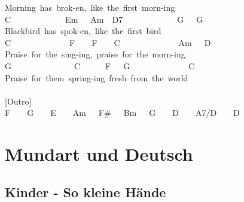 \documentclass[]{book}
\let\stdsection\section
\renewcommand\section{\clearpage\stdsection}
\begin{document}
Morning~has~brok-en,~like~the~first~morn-ing\\
C~~~~~~~~~~~~~Em~~~Am~~D7~~~~~~~~~~~~~G~~~G\\
Blackbird~has~spok-en,~like~the~first~bird\\
C~~~~~~~~~~~~~~F~~~~F~~~~C~~~~~~~~~~~~~~Am~~~D\\
Praise~for~the~sing-ing,~praise~for~the~morn-ing\\
G~~~~~~~~~~~~~~~C~~~~~~F~~~G~~~~~~~~~~~~~~C\\
Praise~for~them~spring-ing~fresh~from~the~world\\
~\\
{[}Outro{]}\\
F~~~~G~~~~E~~~~Am~~~F\#~~~Bm~~~G~~~~D~~~~A7/D~~~~D\\

\hypertarget{mundart-und-deutsch}{%
\chapter{Mundart und Deutsch}\label{mundart-und-deutsch}}

\hypertarget{kinder---so-kleine-hande}{%
\section{Kinder - So kleine Hände}\label{kinder---so-kleine-hande}}
\end{document}

